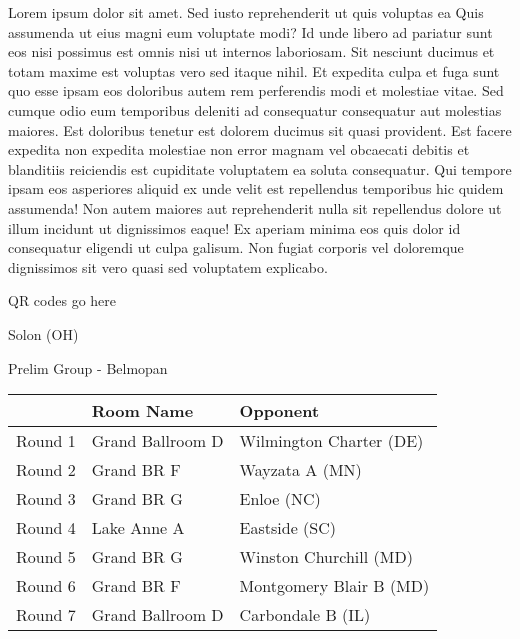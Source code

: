 \documentclass{article}%
\begin{document}
\vspace*{8pt}%
\linebreak%
\newline%
\newline%
Lorem ipsum dolor sit amet. Sed iusto reprehenderit ut quis voluptas ea Quis assumenda ut eius magni eum voluptate modi? Id unde libero ad pariatur sunt eos nisi possimus est omnis nisi ut internos laboriosam. Sit nesciunt ducimus et totam maxime est voluptas vero sed itaque nihil. Et expedita culpa et fuga sunt quo esse ipsam eos doloribus autem rem perferendis modi et molestiae vitae.\newline%
\newline%
Sed cumque odio eum temporibus deleniti ad consequatur consequatur aut molestias maiores. Est doloribus tenetur est dolorem ducimus sit quasi provident. Est facere expedita non expedita molestiae non error magnam vel obcaecati debitis et blanditiis reiciendis est cupiditate voluptatem ea soluta consequatur. Qui tempore ipsam eos asperiores aliquid ex unde velit est repellendus temporibus hic quidem assumenda!\newline%
\newline%
Non autem maiores aut reprehenderit nulla sit repellendus dolore ut illum incidunt ut dignissimos eaque! Ex aperiam minima eos quis dolor id consequatur eligendi ut culpa galisum. Non fugiat corporis vel doloremque dignissimos sit vero quasi sed voluptatem explicabo.\newline%
\newline%
%
\vspace*{30pt}%
\begin{center}%
\begin{Huge}%
QR codes go here%
\end{Huge}%
\end{center}%
\newpage%
%
\begin{center}%
\begin{Huge}%
Solon (OH)%
\end{Huge}%
\vspace*{8pt}%
\linebreak%
\begin{Large}%
Prelim Group {-} Belmopan%
\end{Large}%
\end{center}%
\begin{tabularx}{\textwidth}{|c|Y|Y|}%
\hline%
&Room Name&Opponent\\%
\hline%
Round 1&Grand Ballroom D&Wilmington Charter (DE)\\%
Round 2&Grand BR F&Wayzata A (MN)\\%
Round 3&Grand BR G&Enloe (NC)\\%
Round 4&Lake Anne A&Eastside (SC)\\%
Round 5&Grand BR G&Winston Churchill (MD)\\%
Round 6&Grand BR F&Montgomery Blair B (MD)\\%
Round 7&Grand Ballroom D&Carbondale B (IL)\\%
\hline%
\end{tabularx}%
\end{document}
